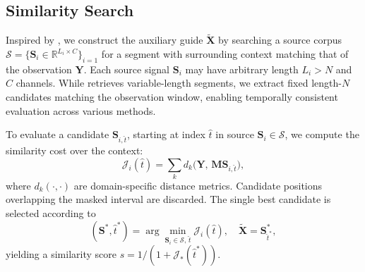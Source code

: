 \documentclass{article}
\begin{document}



\vspace{-3pt}
\subsection{Similarity Search} \label{sec:sim}
\vspace{-2pt}

Inspired by \cite{perraudin_inpainting_2018}, we construct the auxiliary guide $\tilde{\mathbf{X}}$ by searching a source corpus $\mathcal{S} = \{\mathbf{S}_i \in \mathbb{R}^{L_i \times C}\}_{i=1}$ for a segment with surrounding context matching that of the observation $\mathbf{Y}$. Each source signal $\mathbf{S}_i$ may have arbitrary length $L_i > N$ and $C$ channels. While \cite{perraudin_inpainting_2018} retrieves variable-length segments, we extract fixed length-$N$ candidates matching the observation window, enabling temporally consistent evaluation across various methods. 

To evaluate a  candidate $\mathbf{S}_{i,\hat{t}}$, starting at index $\hat{t}$ in source $\mathbf{S}_i \in \mathcal{S}$,
we compute the similarity cost over the context:
\begin{equation}
\mathcal{J}_i(\hat{t}) = \sum_k  d_k\big(\mathbf{Y},\, \mathbf{M} \mathbf{S}_{i,\hat{t}}\big),
\end{equation}
where $d_k(\cdot, \cdot)$ are domain-specific distance metrics. Candidate positions overlapping the masked interval are discarded.
The single best candidate is selected according to 
\begin{equation}\label{eq:candidate_pair}
(\mathbf{S}^*, \hat{t}^*) = \arg \min_{\mathbf{S}_i \in \mathcal{S},\, \hat{t}} \mathcal{J}_i(\hat{t}), \quad \tilde{\mathbf{X}} = \mathbf{S}^*_{\hat{t}^*},
\end{equation}
yielding a similarity score $s = 1/(1 + \mathcal{J}_{*}(\hat{t}^*))$. 
\end{document}
